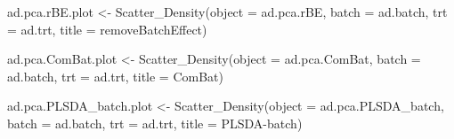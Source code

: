 \documentclass[
]{book}
\newenvironment{Shaded}{\begin{snugshade}}{\end{snugshade}}
\newcommand{\AttributeTok}[1]{\textcolor[rgb]{0.77,0.63,0.00}{#1}}
\newcommand{\CommentTok}[1]{\textcolor[rgb]{0.56,0.35,0.01}{\textit{#1}}}
\newcommand{\FunctionTok}[1]{\textcolor[rgb]{0.00,0.00,0.00}{#1}}
\newcommand{\NormalTok}[1]{#1}
\newcommand{\OtherTok}[1]{\textcolor[rgb]{0.56,0.35,0.01}{#1}}
\newcommand{\SpecialCharTok}[1]{\textcolor[rgb]{0.00,0.00,0.00}{#1}}
\newcommand{\StringTok}[1]{\textcolor[rgb]{0.31,0.60,0.02}{#1}}
\begin{document}
\begin{Shaded}
\end{Shaded}

\begin{Shaded}
\begin{Highlighting}[]
\NormalTok{ad.pca.rBE.plot }\OtherTok{\textless{}{-}} \FunctionTok{Scatter\_Density}\NormalTok{(}\AttributeTok{object =}\NormalTok{ ad.pca.rBE, }
                                   \AttributeTok{batch =}\NormalTok{ ad.batch, }
                                   \AttributeTok{trt =}\NormalTok{ ad.trt, }
                                   \AttributeTok{title =} \StringTok{\textquotesingle{}removeBatchEffect\textquotesingle{}}\NormalTok{)}
\end{Highlighting}
\end{Shaded}

\begin{Shaded}
\begin{Highlighting}[]
\NormalTok{ad.pca.ComBat.plot }\OtherTok{\textless{}{-}} \FunctionTok{Scatter\_Density}\NormalTok{(}\AttributeTok{object =}\NormalTok{ ad.pca.ComBat, }
                                      \AttributeTok{batch =}\NormalTok{ ad.batch, }
                                      \AttributeTok{trt =}\NormalTok{ ad.trt, }
                                      \AttributeTok{title =} \StringTok{\textquotesingle{}ComBat\textquotesingle{}}\NormalTok{)}
\end{Highlighting}
\end{Shaded}

\begin{Shaded}
\begin{Highlighting}[]
\NormalTok{ad.pca.PLSDA\_batch.plot }\OtherTok{\textless{}{-}} \FunctionTok{Scatter\_Density}\NormalTok{(}\AttributeTok{object =}\NormalTok{ ad.pca.PLSDA\_batch, }
                                           \AttributeTok{batch =}\NormalTok{ ad.batch, }
                                           \AttributeTok{trt =}\NormalTok{ ad.trt, }
                                           \AttributeTok{title =} \StringTok{\textquotesingle{}PLSDA{-}batch\textquotesingle{}}\NormalTok{)}
\end{Highlighting}
\end{Shaded}
\end{document}
